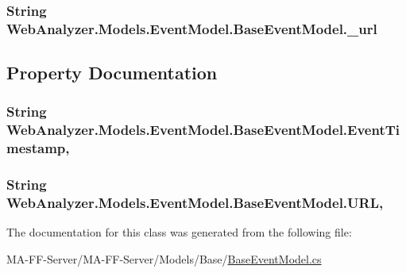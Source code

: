 \subsubsection[{\+\_\+url}]{\setlength{\rightskip}{0pt plus 5cm}String Web\+Analyzer.\+Models.\+Event\+Model.\+Base\+Event\+Model.\+\_\+url\hspace{0.3cm}{\ttfamily [protected]}}\label{class_web_analyzer_1_1_models_1_1_event_model_1_1_base_event_model_a8cfc8644deaf4edfec7fcd7f08dfa20c}


\subsection{Property Documentation}
\hypertarget{class_web_analyzer_1_1_models_1_1_event_model_1_1_base_event_model_ae6d980edbc758b7c413181778d79af3b}{}
\subsubsection[{Event\+Timestamp}]{\setlength{\rightskip}{0pt plus 5cm}String Web\+Analyzer.\+Models.\+Event\+Model.\+Base\+Event\+Model.\+Event\+Timestamp\hspace{0.3cm}{\ttfamily [get]}, {\ttfamily [set]}}\label{class_web_analyzer_1_1_models_1_1_event_model_1_1_base_event_model_ae6d980edbc758b7c413181778d79af3b}
\hypertarget{class_web_analyzer_1_1_models_1_1_event_model_1_1_base_event_model_a328a729d379e64c2007b70e828c95adb}{}
\subsubsection[{U\+R\+L}]{\setlength{\rightskip}{0pt plus 5cm}String Web\+Analyzer.\+Models.\+Event\+Model.\+Base\+Event\+Model.\+U\+R\+L\hspace{0.3cm}{\ttfamily [get]}, {\ttfamily [set]}}\label{class_web_analyzer_1_1_models_1_1_event_model_1_1_base_event_model_a328a729d379e64c2007b70e828c95adb}


The documentation for this class was generated from the following file\+:\begin{DoxyCompactItemize}
\item 
M\+A-\/\+F\+F-\/\+Server/\+M\+A-\/\+F\+F-\/\+Server/\+Models/\+Base/\hyperlink{_base_event_model_8cs}{Base\+Event\+Model.\+cs}\end{DoxyCompactItemize}
